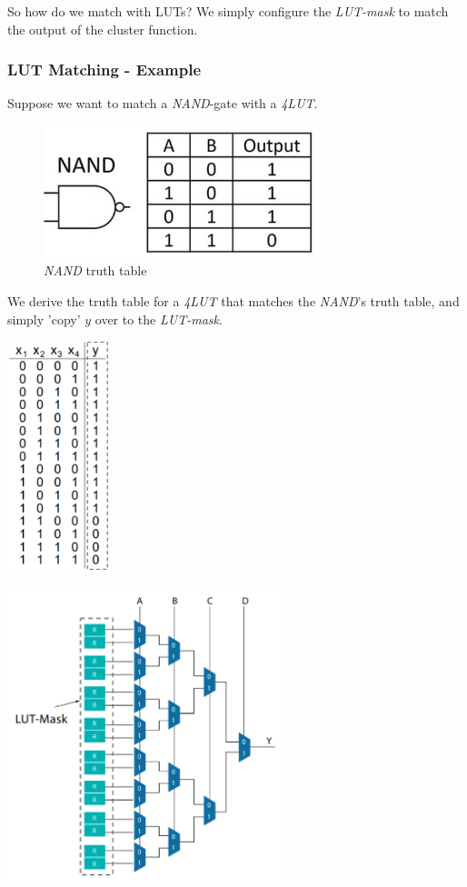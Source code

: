 \documentclass{article}
\begin{document}
So how do we match with LUTs? We simply configure the \textit{LUT-mask} to match the output of the cluster function.

\subsubsection{LUT Matching - Example}
Suppose we want to match a \textit{NAND}-gate with a \textit{4LUT}.

\begin{figure}[htp]
    \centering
    \includegraphics[width=8cm, scale=1]{S7/nandTruth.PNG}
    \caption{\textit{NAND} truth table}
\end{figure}

We derive the truth table for a \textit{4LUT} that matches the \textit{NAND}'s truth table, and simply 'copy' $y$ over to the \textit{LUT-mask}.

\begin{minipage}[c]{0.5\textwidth}
    \centering
    \includegraphics[width=3cm, scale=1]{S7/lutTruth1.PNG}
\end{minipage}%
\begin{minipage}[c]{0.5\textwidth}
    \centering
    \includegraphics[width=8cm, scale=1]{S7/lutmask.PNG}
\end{minipage}%
\end{document}

